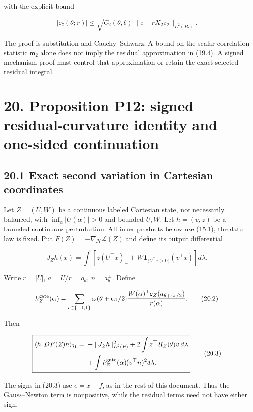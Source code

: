 \documentclass[
  10pt,
]{article}
\begin{document}
with the explicit bound

\[
 |\varepsilon_2(\theta;r)|
 \le \sqrt{C_2(\theta,\theta)}
      \|e-rX_2e_2\|_{L^2(P_2)}.
 \tag{19.4}
\]

The proof is substitution and Cauchy--Schwarz. A bound on the scalar
correlation statistic \(\mathsf m_2\) alone does not imply the residual
approximation in (19.4). A signed mechanism proof must control that
approximation or retain the exact selected residual integral.

\section{20. Proposition P12: signed residual-curvature identity and
one-sided
continuation}\label{proposition-p12-signed-residual-curvature-identity-and-one-sided-continuation}

\subsection{20.1 Exact second variation in Cartesian
coordinates}\label{exact-second-variation-in-cartesian-coordinates}

Let \(Z=(U,W)\) be a continuous labeled Cartesian state, not necessarily
balanced, with \(\inf_\alpha|U(\alpha)|>0\) and bounded \(U,W\). Let
\(h=(v,z)\) be a bounded continuous perturbation. All inner products
below use (15.1); the data law is fixed. Put
\(F(Z)=-\nabla_{\mathcal H}\mathcal L(Z)\) and define its output
differential

\[
 J_Zh(x)=\int\left[z(U^\top x)_+
             +W\mathbf1_{\{U^\top x>0\}}(v^\top x)\right]d\lambda.
 \tag{20.1}
\]

Write \(r=|U|\), \(a=U/r=a_\theta\), \(n=a_\theta^\perp\). Define

\[
 h_Z^{\rm gate}(\alpha)=
 \sum_{\epsilon\in\{-1,1\}}
 \omega(\theta+\epsilon\pi/2)
 \frac{W(\alpha)^\top e_Z(a_{\theta+\epsilon\pi/2})}{r(\alpha)}.
 \tag{20.2}
\]

Then

\[
 \boxed{\begin{aligned}
 \langle h,DF(Z)h\rangle_{\mathcal H}
 ={}&-\|J_Zh\|_{L^2(P)}^2
       +2\int z^\top R_Z(\theta)v\,d\lambda\\
    &+\int h_Z^{\rm gate}(\alpha)(v^\top n)^2d\lambda.
 \end{aligned}}
 \tag{20.3}
\]

The signs in (20.3) use \(e=x-f\), as in the rest of this document. Thus
the Gauss--Newton term is nonpositive, while the residual terms need not
have either sign.
\end{document}
